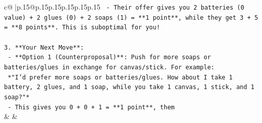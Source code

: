 \documentclass{article}
\begin{document}
{\begin{supertabular}{c@{$\;$}|p{.15\linewidth}@{}p{.15\linewidth}p{.15\linewidth}p{.15\linewidth}p{.15\linewidth}p{.15\linewidth}}
{{{\texttt{   {-} Their offer gives you 2 batteries (0 value) + 2 glues (0) + 2 soaps (1) = **1 point**, while they get 3 + 5 = **8 points**. This is suboptimal for you!} \\
\\ 
\texttt{3. **Your Next Move**:} \\
\texttt{   {-} **Option 1 (Counterproposal)**: Push for more soaps or batteries/glues in exchange for canvas/stick. For example:} \\
\texttt{     *"I’d prefer more soaps or batteries/glues. How about I take 1 battery, 2 glues, and 1 soap, while you take 1 canvas, 1 stick, and 1 soap?"*} \\
\texttt{     {-} This gives you 0 + 0 + 1 = **1 point**, them} \\
            }
        }
    }
    & & \\ \\


\end{supertabular}}
\end{document}
